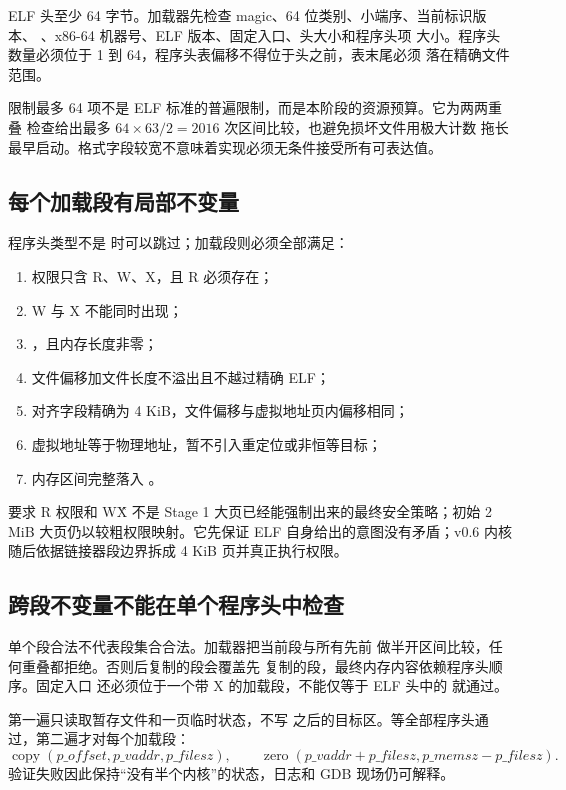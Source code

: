 ELF 头至少 64 字节。加载器先检查 magic、64 位类别、小端序、当前标识版本、
、x86-64 机器号、ELF 版本、固定入口、头大小和程序头项
大小。程序头数量必须位于 1 到 64，程序头表偏移不得位于头之前，表末尾必须
落在精确文件范围。

限制最多 64 项不是 ELF 标准的普遍限制，而是本阶段的资源预算。它为两两重叠
检查给出最多 \(64\times63/2=2016\) 次区间比较，也避免损坏文件用极大计数
拖长最早启动。格式字段较宽不意味着实现必须无条件接受所有可表达值。

\subsection{每个加载段有局部不变量}

程序头类型不是  时可以跳过；加载段则必须全部满足：

\begin{enumerate}[label=\arabic*.]
  \item 权限只含 R、W、X，且 R 必须存在；
  \item W 与 X 不能同时出现；
  \item {}，且内存长度非零；
  \item 文件偏移加文件长度不溢出且不越过精确 ELF；
  \item 对齐字段精确为 4 KiB，文件偏移与虚拟地址页内偏移相同；
  \item 虚拟地址等于物理地址，暂不引入重定位或非恒等目标；
  \item 内存区间完整落入 。
\end{enumerate}

要求 R 权限和 W\^X 不是 Stage 1 大页已经能强制出来的最终安全策略；初始
2 MiB 大页仍以较粗权限映射。它先保证 ELF 自身给出的意图没有矛盾；v0.6
内核随后依据链接器段边界拆成 4 KiB 页并真正执行权限。

\subsection{跨段不变量不能在单个程序头中检查}

单个段合法不代表段集合合法。加载器把当前段与所有先前
 做半开区间比较，任何重叠都拒绝。否则后复制的段会覆盖先
复制的段，最终内存内容依赖程序头顺序。固定入口
 还必须位于一个带 X 的加载段，不能仅等于 ELF 头中的
 就通过。

第一遍只读取暂存文件和一页临时状态，不写
 之后的目标区。等全部程序头通过，第二遍才对每个加载段：
\[
  \operatorname{copy}(p\_offset,p\_vaddr,p\_filesz),\qquad
  \operatorname{zero}(p\_vaddr+p\_filesz,p\_memsz-p\_filesz).
\]
验证失败因此保持“没有半个内核”的状态，日志和 GDB 现场仍可解释。

